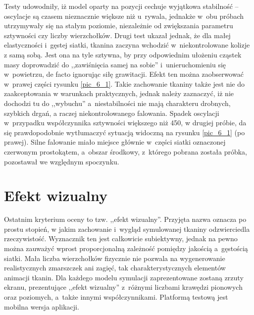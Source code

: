 		Testy udowodniły, iż model oparty na pozycji cechuje wyjątkowa stabilność -- oscylacje są czasem nieznacznie większe niż u~rywala, jednakże w~obu próbach utrzymywały się na stałym poziomie, niezależnie od zwiększania parametru sztywności czy liczby wierzchołków. Drugi test ukazał jednak, że dla małej elastyczności i~gęstej siatki, tkanina zaczyna wchodzić w~niekontrolowane kolizje z samą sobą. Jest ona na tyle sztywna, by przy odpowiednim ułożeniu cząstek masy doprowadzić do ,,zawiśnięcia samej na sobie'' i~unieruchomieniu się w~powietrzu, de facto ignorując siłę grawitacji. Efekt ten można zaobserwować w~prawej części rysunku \ref{pic_6_1}. Takie zachowanie tkaniny także jest nie do zaakceptowania w warunkach praktycznych, jednak należy zaznaczyć, iż nie dochodzi tu do ,,wybuchu'' a~niestabilności nie mają charakteru drobnych, szybkich drgań, a raczej niekontrolowanego falowania. Spadek oscylacji w~przypadku współczynnika sztywności większego niż 450, w drugiej próbie, da się prawdopodobnie wytłumaczyć sytuacją widoczną na rysunku \ref{pic_6_1} (po prawej). Silne falowanie miało miejsce głównie w~części siatki oznaczonej czerwonym prostokątem, a~obszar środkowy, z~którego pobrana została próbka, pozostawał we względnym spoczynku.
		
		
		
		
		
	\section{Efekt wizualny}
	\label{t:wyniki:efektwiz}
		
		Ostatnim kryterium oceny to tzw. ,,efekt wizualny''. Przyjęta nazwa oznacza po prostu stopień, w jakim zachowanie i~wygląd symulowanej tkaniny odzwierciedla rzeczywistość. Wyznacznik ten jest całkowicie subiektywny, jednak na pewno można zauważyć wprost proporcjonalną zależność pomiędzy jakością a~gęstością siatki. Mała liczba wierzchołków fizycznie nie pozwala na wygenerowanie realistycznych zmarszczek ani zagięć, tak charakterystycznych elementów animacji tkanin. Dla każdego modelu symulacji zaprezentowane zostaną zrzuty ekranu, prezentujące ,,efekt wizualny'' z~różnymi liczbami krawędzi pionowych oraz poziomych, a~także innymi współczynnikami. Platformą testową jest mobilna wersja aplikacji.
		
